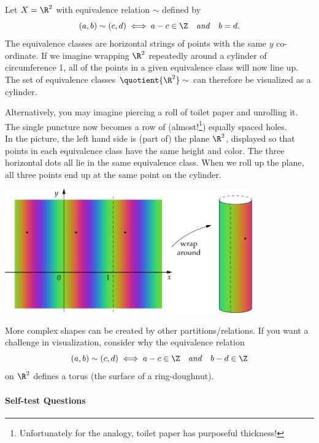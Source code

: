 Let $X=\R^2$ with equivalence relation $\sim$ defined by
\[(a,b)\sim (c,d)\iff
a-c\in\Z\quad\text{\emph{and}}\quad b=d.\]
The equivalence classes are horizontal strings of points with the same $y$ co-ordinate. If we imagine wrapping $\R^2$ repeatedly around a cylinder of circumference 1, all of the points in a given equivalence class will now line up. The set of equivalence classes $\quotient{\R^2}\sim$ can therefore be visualized as a cylinder.

Alternatively, you may imagine piercing a roll of toilet paper and unrolling it. The single puncture now becomes a row of (almost!\footnote{Unfortunately for the analogy, toilet paper has purposeful thickness!}) equally spaced holes.\\

In the picture, the left hand side is (part of) the plane $\R^2$, displayed so that points in each equivalence class have the same height and color. The three horizontal dots all lie in the same equivalence class. When we roll up the plane, all three points end up at the same point on the cylinder.

\begin{center}
\includegraphics[width=0.8\textwidth]{relations-13-cylinder}
\end{center}

More complex shapes can be created by other partitions/relations. If you want a challenge in visualization, consider why the equivalence relation
\[(a,b)\sim (c,d)\iff a-c\in\Z\quad\text{\emph{and}}\quad b-d\in\Z\]
on $\R^2$ defines a torus (the surface of a ring-doughnut).

\paragraph{Self-test Questions}

